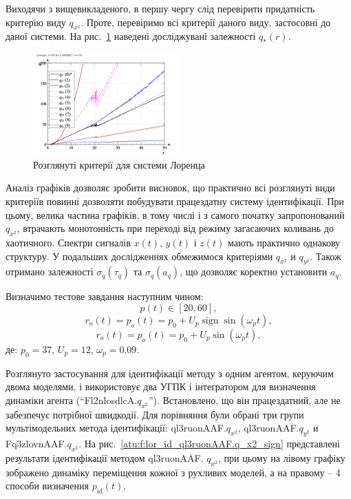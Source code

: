 \documentclass[a4paper,13pt]{atuaref}
\DeclareMathOperator*{\sign}{sign}
\begin{document}
Виходячи з вищевикладеного, в першу чергу слід перевірити придатність критерію
виду $ q_ {x ^ 2} $. Проте, перевіримо всі критерії даного виду, застосовні до
даної системи. На рис.~\ref{atu:f:lor_q} наведені досліджувані залежності
$q_{*}(r)$.

\begin{figure}[ht!]
  \centerline{\includegraphics[width=0.5\textwidth]{p5/p/cha/lor/lor_q-p_q_r.png} }
  \caption{Розглянуті критерії для системи Лоренца}
  \label{atu:f:lor_q}
\end{figure}

Аналіз графіків дозволяє зробити висновок, що практично всі розглянуті види
критеріїв повинні дозволяти побудувати працездатну систему ідентифікації. При
цьому, велика частина графіків, в тому числі і з самого початку запропонований
$q_{x^2}$, втрачають монотонність при переході від режиму загасаючих
коливань до хаотичного.
Спектри сигналів $ x (t) $, $ y (t) $ і $ z (t) $ мають практично однакову
структуру. У подальших дослідженнях обмежимося критеріями
$q_{x^2}$ и
$q_{y^2}$.
Також отримано залежності $ \sigma_q(\tau_q) $ та  $ \sigma_q(a_q) $,
що дозволяє коректно установити $a_q$.

Визначимо тестове завдання наступним чином:
\[
  p(t) \in [20, 60],
\]
%
\begin{equation}
  r_o(t) = p_o(t) = p_0 +  U_{p} \sign \sin( \omega_{p} t ),
  \label{atu:eq:lor_po_t_sign}
\end{equation}
%
%
\begin{equation}
  r_o(t) = p_o(t) = p_0 +  U_{p} \sin( \omega_{p} t ),
  \label{atu:eq:lor_po_t_sin}
\end{equation}
%
де:
$p_0 = 37$, $U_p=12$, $\omega_p=0.09$.

Розглянуто застосування для ідентифікації методу з одним агентом, керуючим двома
моделями, і використовує два УГПК і інтегратором для визначення динаміки агента
(``Fl2nlosdlcA.$q_{x^2}$''). Встановлено, що він
працездатний, але
не забезпечує потрібної швидкодії.
Для порівняння були обрані три групи мультімодельних метода ідентифікації:
ql3ruonAAF.$q_{x^2}$,
ql3ruonAAF.$q_{y^2}$ и
Fq3zlovnAAF.$q_{x^2}$.
На рис.~\ref{atu:f:lor_id_ql3ruonAAF.q_x2_sign} представлені результати
ідентифікації методом ql3ruonAAF. $q_{x^2} $, при цьому на лівому графіку
зображено динаміку переміщення кожної з рухливих моделей, а на правому -- 4
способи визначення $ p_\mathrm{id} (t) $.
\end{document}
